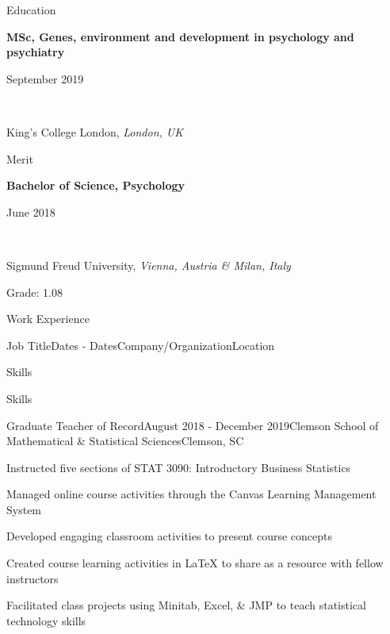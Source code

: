 \documentclass{resume2} %
\newcommand\textbox[1]{%
  \parbox{.48\textwidth}{#1}%
}
\begin{document}
\thispagestyle{plain}



\begin{rSection}{Education}



\textbox{\textbf{MSc, Genes, environment and development in psychology and psychiatry}\hfill}\textbox{\hfill September 2019}\\
\textbox{King's College London, \textit{London, UK}\hfill}{\hfill Merit}

\textbox{\textbf{Bachelor of Science, Psychology}\hfill}\textbox{\hfill June 2018}\\
\textbox{Sigmund Freud University, \textit{Vienna, Austria & Milan, Italy}}{\hfill Grade: 1.08}


\end{rSection}


\begin{rSection}{Work Experience}


\begin{rSubsection}{Job Title}{Dates - Dates}{Company/Organization}{Location}
\item Skills
\item Skills
\end{rSubsection}

\begin{rSubsection}{Graduate Teacher of Record}{August 2018 - December 2019}{Clemson School of Mathematical \& Statistical Sciences}{Clemson, SC}
\item Instructed five sections of STAT 3090: Introductory Business Statistics
\item Managed online course activities through the Canvas Learning Management System
\item Developed engaging classroom activities to present course concepts
\item Created course learning activities in \LaTeX \hspace{.1mm} to share as a resource with fellow instructors
\item Facilitated class projects using Minitab, Excel, \& JMP to teach statistical technology skills
\end{rSubsection}

\end{rSection}
\end{document}
